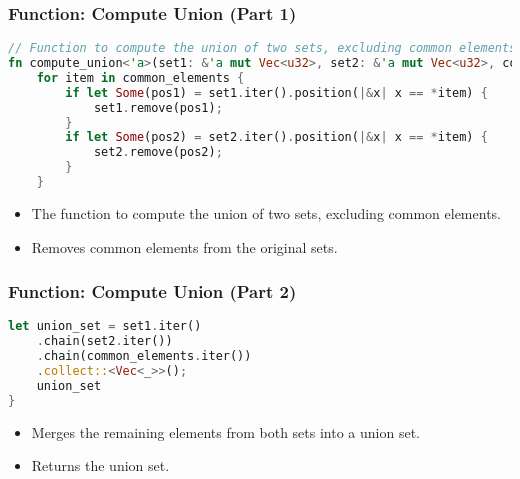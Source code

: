 \documentclass[aspectratio=169, table]{beamer}
\begin{document}
\begin{frame}[fragile]
\frametitle{Function: Compute Union (Part 1)}
\vspace{10pt}
\begin{lstlisting}[language=Rust]
// Function to compute the union of two sets, excluding common elements
fn compute_union<'a>(set1: &'a mut Vec<u32>, set2: &'a mut Vec<u32>, common_elements: &'a Vec<u32>) -> Vec<&'a u32> {
	for item in common_elements {
		if let Some(pos1) = set1.iter().position(|&x| x == *item) {
			set1.remove(pos1);
		}
		if let Some(pos2) = set2.iter().position(|&x| x == *item) {
			set2.remove(pos2);
		}
	}
\end{lstlisting}
\begin{itemize}
	\item The function to compute the union of two sets, excluding common elements.
	\item Removes common elements from the original sets.
\end{itemize}
\end{frame}

\begin{frame}[fragile]
\frametitle{Function: Compute Union (Part 2)}
\begin{lstlisting}[language=Rust]
	let union_set = set1.iter()
	.chain(set2.iter())
	.chain(common_elements.iter())
	.collect::<Vec<_>>();
	union_set
}
\end{lstlisting}
\begin{itemize}
		\item Merges the remaining elements from both sets into a union set.
		\item Returns the union set.
	\end{itemize}
\end{frame}
\end{document}
